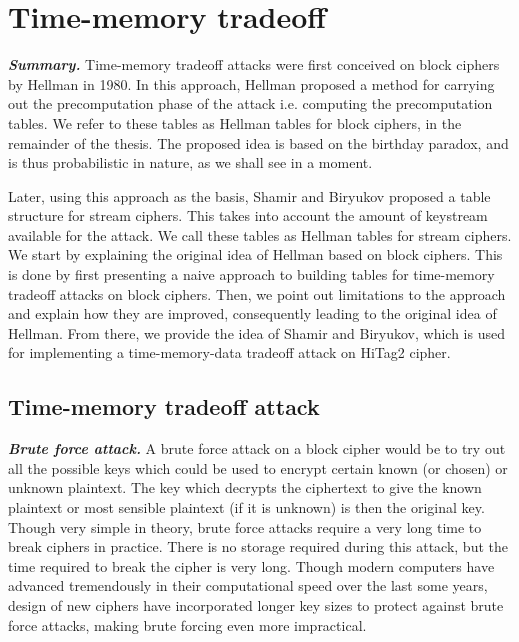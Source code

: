\chapter{Time-memory tradeoff}

\footnotesize
\indent \textbf{\textit{Summary.}} Time-memory tradeoff attacks were first conceived on block ciphers by Hellman in 1980. In this approach, Hellman proposed a method for carrying out the precomputation phase of the attack i.e. computing the precomputation tables. We refer to these tables as Hellman tables for block ciphers, in the remainder of the thesis. The proposed idea is based on the birthday paradox, and is thus probabilistic in nature, as we shall see in a moment. 

Later, using this approach as the basis, Shamir and Biryukov proposed a table structure for stream ciphers. This takes into account the amount of keystream available for the attack. We call these tables as Hellman tables for stream ciphers. We start by explaining the original idea of Hellman based on block ciphers. This is done by first presenting a naive approach to building tables for time-memory tradeoff attacks on block ciphers. Then, we point out limitations to the approach and explain how they are improved, consequently leading to the original idea of Hellman. From there, we provide the idea of Shamir and Biryukov, which is used for implementing a time-memory-data tradeoff attack on HiTag2 cipher.

\normalsize
\section{Time-memory tradeoff attack}

\noindent \textit{\textbf{Brute force attack.}} A brute force attack on a block cipher would be to try out all the possible keys which could be used to encrypt certain known (or chosen) or unknown plaintext. The key which decrypts the ciphertext to give the known plaintext or most sensible plaintext (if it is unknown) is then the original key. Though very simple in theory, brute force attacks require a very long time to break ciphers in practice. There is no storage required during this attack, but the time required to break the cipher is very long. Though modern computers have advanced tremendously in their computational speed over the last some years, design of new ciphers have incorporated longer key sizes to protect against brute force attacks, making brute forcing even more impractical.

